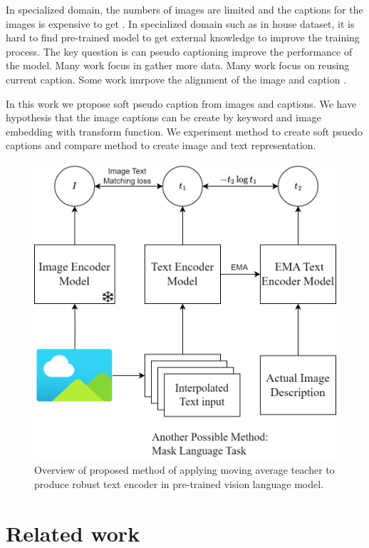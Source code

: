 \documentclass[10pt,twocolumn,letterpaper]{article}
\begin{document}
In specialized domain, the numbers of images are limited and the captions for the images is expensive to get \cite{generate_fashion_caption}. %
In specialized domain such as in house dataset, it is hard to find pre-trained model to get external knowledge to improve the training process.
The key question is can pseudo captioning improve the performance of the model. %
Many work focus in gather more data.
Many work focus on reusing current caption.
Some work imrpove the alignment of the image and caption \cite{zlap}.

In this work we propose soft pseudo caption from images and captions.
We have hypothesis that the image captions can be create by keyword and image embedding with transform function.
We experiment method to create soft psuedo captions and compare method to create image and text representation.


\begin{figure}[h]
   \label{fig:overall_method}
   \begin{center}
      \includegraphics[width=0.8\linewidth]{Images/ThesisDiagram.png}
   \end{center}
   \caption{Overview of proposed method of applying moving average teacher to produce robust text encoder in pre-trained vision language model.}
   \small
\end{figure}


\section{Related work}
\end{document}
